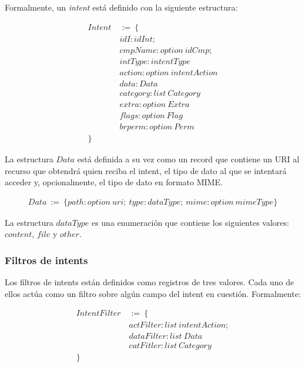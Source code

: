 Formalmente, un \textit{intent} está definido con la siguiente estructura:

\begin{align*}
    Intent\  & :=\ \{                       \\
             & idI: idInt;                  \\
             & cmpName: option\ idCmp;      \\
             & intType: intentType          \\
             & action: option\ intentAction \\
             & data: Data                   \\
             & category: list\ Category     \\
             & extra: option\ Extra         \\
             & flags: option\ Flag          \\
             & brperm: option\ Perm         \\
    \}
\end{align*}

La estructura $Data$ está definida a su vez como un record que contiene un URI al recurso que obtendrá
quien reciba el intent, el tipo de dato al que se intentará acceder y, opcionalmente, el tipo de dato en
formato MIME.

\begin{align*}
    Data\ :=\ \{ path: option\ uri;\ type: dataType;\ mime: option\ mimeType \}
\end{align*}

La estructura $dataType$ es una enumeración que contiene los siguientes valores: $content$, $file$ y
$other$.

\subsubsection*{Filtros de intents}
Los filtros de intents están definidos como registros de tres valores. Cada uno de ellos actúa como un
filtro sobre algún campo del intent en cuestión. Formalmente:

\begin{align*}
    IntentFilter\  & :=\ \{                         \\
                   & actFilter: list\ intentAction; \\
                   & dataFilter: list\ Data         \\
                   & catFitler: list\ Category      \\
    \}
\end{align*}

